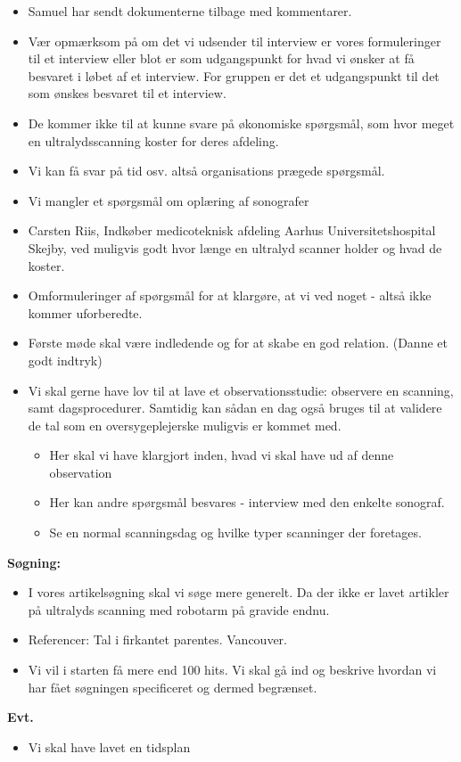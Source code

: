 \begin{itemize}
\item Samuel har sendt dokumenterne tilbage med kommentarer.
\item Vær opmærksom på om det vi udsender til interview er vores formuleringer til et interview eller blot er som udgangspunkt for hvad vi ønsker at få besvaret i løbet af et interview. For gruppen er det et udgangspunkt til det som ønskes besvaret til et interview.
\item De kommer ikke til at kunne svare på økonomiske spørgsmål, som hvor meget en ultralydsscanning koster for deres afdeling.
\item Vi kan få svar på tid osv. altså organisations prægede spørgsmål.
\item Vi mangler et spørgsmål om oplæring af sonografer
\item Carsten Riis, Indkøber medicoteknisk afdeling Aarhus Universitetshospital Skejby, ved muligvis godt hvor længe en ultralyd scanner holder og hvad de koster.
\item Omformuleringer af spørgsmål for at klargøre, at vi ved noget - altså ikke kommer uforberedte.
\item Første møde skal være indledende og for at skabe en god relation. (Danne et godt indtryk)
\item Vi skal gerne have lov til at lave et observationsstudie: observere en scanning, samt dagsprocedurer. Samtidig kan sådan en dag også bruges til at validere de tal som en oversygeplejerske muligvis er kommet med.
\begin{itemize}
\item Her skal vi have klargjort inden, hvad vi skal have ud af denne observation
\item Her kan andre spørgsmål besvares - interview med den enkelte sonograf.
\item Se en normal scanningsdag og hvilke typer scanninger der foretages.
\end{itemize}
\end{itemize}
\textbf{Søgning:}
\begin{itemize}
\item I vores artikelsøgning skal vi søge mere generelt. Da der ikke er lavet artikler på ultralyds scanning med robotarm på gravide endnu.
\item Referencer: Tal i firkantet parentes. Vancouver.
\item Vi vil i starten få mere end 100 hits. Vi skal gå ind og beskrive hvordan vi har fået søgningen specificeret og dermed begrænset.
\end{itemize}
\textbf{Evt.}
\begin{itemize}
\item Vi skal have lavet en tidsplan
\end{itemize}
\newpage